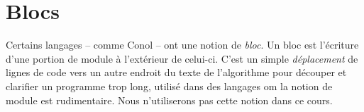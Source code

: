 \section{Blocs}
	
	Certains langages -- comme Conol -- ont une notion de \emph{bloc}.
	Un bloc est l’écriture d’une portion de module à l’extérieur de celui-ci. 
	C’est un simple \textit{déplacement} de lignes de code 
	vers un autre endroit du texte de l’algorithme pour découper
	et clarifier un programme trop long,
	utilisé dans des langages om la notion de module est rudimentaire. 
	Nous n'utiliserons pas cette notion dans ce cours.
	 






